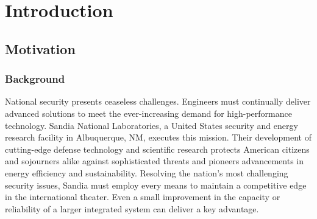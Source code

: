 \documentclass[12pt, letterpaper]{report}%
\newcounter{mycounter}           %
\newcounter{sub}[mycounter]      %
\begin{document}

\chapter{Introduction}
\label{chap:Fintro}

	\section{Motivation}
	\label{sec:intro:motive}

		\subsection{Background}
		\label{subsec:intro:motive:background}

			National security presents ceaseless challenges.
			Engineers must continually deliver advanced solutions to meet the ever-increasing demand for high-performance technology.
			Sandia National Laboratories, a United States security and energy research facility in Albuquerque, NM, executes this mission.
			Their development of cutting-edge defense technology and scientific research protects American citizens and sojourners alike against sophisticated threats
			and pioneers advancements in energy efficiency and sustainability.
			Resolving the nation's most challenging security issues, Sandia must employ every means to maintain a competitive edge in the international theater.
			Even a small improvement in the capacity or reliability of a larger integrated system can deliver a key advantage.
\end{document}
